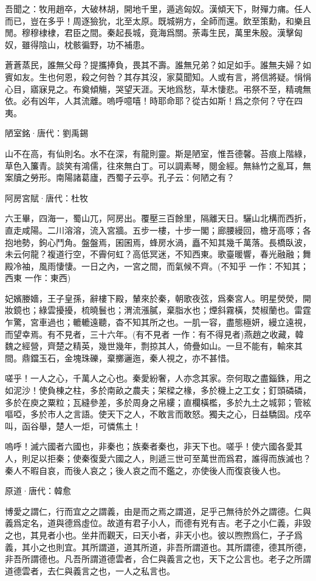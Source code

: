 \documentclass[12pt,a4paper]{ctexbook}
\begin{document}
吾聞之：牧用趙卒，大破林胡，開地千里，遁逃匈奴。漢傾天下，財殫力痡。任人而已，豈在多乎！周逐獫狁，北至太原。既城朔方，全師而還。飲至策勳，和樂且閒。穆穆棣棣，君臣之間。秦起長城，竟海爲關。荼毒生民，萬里朱殷。漢擊匈奴，雖得陰山，枕骸徧野，功不補患。\par
蒼蒼蒸民，誰無父母？提攜捧負，畏其不壽。誰無兄弟？如足如手。誰無夫婦？如賓如友。生也何恩，殺之何咎？其存其沒，家莫聞知。人或有言，將信將疑。悁悁心目，寤寐見之。布奠傾觴，哭望天涯。天地爲愁，草木悽悲。弔祭不至，精魂無依。必有凶年，人其流離。嗚呼噫嘻！時耶命耶？從古如斯！爲之奈何？守在四夷。\par
陋室銘·唐代：劉禹錫 \par
山不在高，有仙則名。水不在深，有龍則靈。斯是陋室，惟吾德馨。苔痕上階綠，草色入簾青。談笑有鴻儒，往來無白丁。可以調素琴，閱金經。無絲竹之亂耳，無案牘之勞形。南陽諸葛廬，西蜀子云亭。孔子云：何陋之有？\par
阿房宮賦·唐代：杜牧 \par
六王畢，四海一，蜀山兀，阿房出。覆壓三百餘里，隔離天日。驪山北構而西折，直走咸陽。二川溶溶，流入宮牆。五步一樓，十步一閣；廊腰縵回，檐牙高啄；各抱地勢，鉤心鬥角。盤盤焉，囷囷焉，蜂房水渦，矗不知其幾千萬落。長橋臥波，未云何龍？複道行空，不霽何虹？高低冥迷，不知西東。歌臺暖響，春光融融；舞殿冷袖，風雨悽悽。一日之內，一宮之間，而氣候不齊。(不知乎 一作：不知其；西東 一作：東西)\par
妃嬪媵嬙，王子皇孫，辭樓下殿，輦來於秦，朝歌夜弦，爲秦宮人。明星熒熒，開妝鏡也；綠雲擾擾，梳曉鬟也；渭流漲膩，棄脂水也；煙斜霧橫，焚椒蘭也。雷霆乍驚，宮車過也；轆轆遠聽，杳不知其所之也。一肌一容，盡態極妍，縵立遠視，而望幸焉。有不見者，三十六年。(有不見者 一作：有不得見者)燕趙之收藏，韓魏之經營，齊楚之精英，幾世幾年，剽掠其人，倚疊如山。一旦不能有，輸來其間。鼎鐺玉石，金塊珠礫，棄擲邐迤，秦人視之，亦不甚惜。\par
嗟乎！一人之心，千萬人之心也。秦愛紛奢，人亦念其家。奈何取之盡錙銖，用之如泥沙！使負棟之柱，多於南畝之農夫；架樑之椽，多於機上之工女；釘頭磷磷，多於在庾之粟粒；瓦縫參差，多於周身之帛縷；直欄橫檻，多於九土之城郭；管絃嘔啞，多於市人之言語。使天下之人，不敢言而敢怒。獨夫之心，日益驕固。戍卒叫，函谷舉，楚人一炬，可憐焦土！\par
嗚呼！滅六國者六國也，非秦也；族秦者秦也，非天下也。嗟乎！使六國各愛其人，則足以拒秦；使秦復愛六國之人，則遞三世可至萬世而爲君，誰得而族滅也？秦人不暇自哀，而後人哀之；後人哀之而不鑑之，亦使後人而復哀後人也。\par
原道·唐代：韓愈 \par
博愛之謂仁，行而宜之之謂義，由是而之焉之謂道，足乎己無待於外之謂德。仁與義爲定名，道與德爲虛位。故道有君子小人，而德有兇有吉。老子之小仁義，非毀之也，其見者小也。坐井而觀天，曰天小者，非天小也。彼以煦煦爲仁，孑孑爲義，其小之也則宜。其所謂道，道其所道，非吾所謂道也。其所謂德，德其所德，非吾所謂德也。凡吾所謂道德雲者，合仁與義言之也，天下之公言也。老子之所謂道德雲者，去仁與義言之也，一人之私言也。\par
\end{document}
